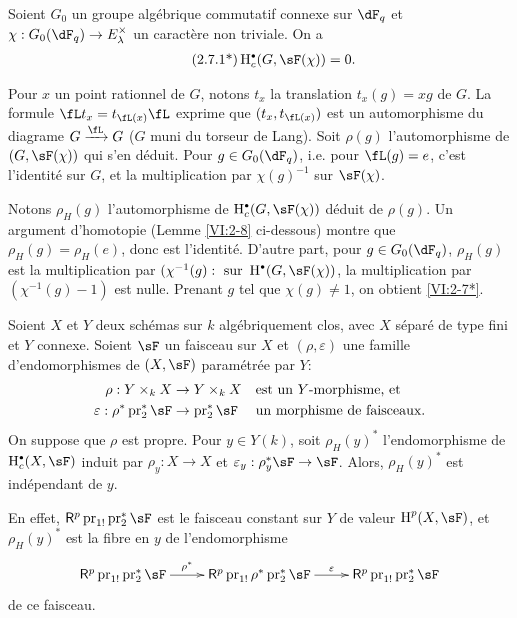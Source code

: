 \begin{theorem*}[2.7*]\label{VI:2-7*}
Soient $G_0$ un groupe alg\'ebrique commutatif connexe sur $\dF_q$ et 
$\chi:G_0(\dF_q) \to E_\lambda^\times$ un caract\`ere non triviale. On a 
\begin{align*}\tag{2.7.1*}\label{VI:eq:2-7-1*}
  \h_c^\bullet(G,\sF(\chi)) = 0 \text{.}
\end{align*}
\end{theorem*}

Pour $x$ un point rationnel de $G$, notons $t_x$ la translation $t_x(g) = x g$ 
de $G$. La formule $\fL t_x = t_{\fL(x)} \fL$ exprime que $(t_x,t_{\fL(x)})$ 
est un automorphisme du diagrame $G\xrightarrow\fL G$ ($G$ muni du torseur de 
Lang). Soit $\rho(g)$ l'automorphisme de $(G,\sF(\chi))$ qui s'en d\'eduit. 
Pour $g\in G_0(\dF_q)$, i.e. pour $\fL(g) = e$, c'est l'identit\'e sur $G$, et 
la multiplication par $\chi(g)^{-1}$ sur $\sF(\chi)$. 

Notons $\rho_H(g)$ l'automorphisme de $\h_c^\bullet(G,\sF(\chi))$ d\'eduit de 
$\rho(g)$. Un argument d'homotopie (Lemme \ref{VI:2-8} ci-dessous) montre que 
$\rho_H(g) = \rho_H(e)$, donc est l'identit\'e. D'autre part, pour 
$g\in G_0(\dF_q)$, $\rho_H(g)$ est la multiplication par 
$(\chi^{-1}(g):\text{ sur }\h^\bullet(G,\sF(\chi))$, la multiplication par 
$(\chi^{-1}(g)-1)$ est nulle. Prenant $g$ tel que $\chi(g)\ne 1$, on obtient 
\ref{VI:2-7*}. 





\begin{lemma_}\label{VI:2-8}
Soient $X$ et $Y$ deux sch\'emas sur $k$ alg\'ebriquement clos, avec $X$ 
s\'epar\'e de type fini et $Y$ connexe. Soient $\sF$ un faisceau sur $X$ et 
$(\rho,\varepsilon)$ une famille d'endomorphismes de $(X,\sF)$ param\'etr\'ee 
par $Y$: 
\begin{align*} 
  \rho:Y\times_k X &\to Y\times_k X && \text{est un $Y$-morphisme, et} \\
  \varepsilon:\rho^\ast \operatorname{pr}_2^\ast \sF &\to \operatorname{pr}_2^\ast\sF && \text{un morphisme de faisceaux.} 
\end{align*}
On suppose que $\rho$ est propre. Pour $y\in Y(k)$, soit $\rho_H(y)^\ast$ 
l'endomorphisme de $\h_c^\bullet(X,\sF)$ induit par $\rho_y:X\to X$ et 
$\varepsilon_y:\rho_y^\ast\sF\to \sF$. Alors, $\rho_H(y)^\ast$ est 
ind\'ependant de $y$. 
\end{lemma_}

En effet, $\R^p \operatorname{pr}_{1!} \operatorname{pr}_2^\ast\sF$ est le 
faisceau constant sur $Y$ de valeur $\h^p(X,\sF)$, et $\rho_H(y)^\ast$ est la 
fibre en $y$ de l'endomorphisme 
\[\xymatrix{
  \R^p \operatorname{pr}_{1!} \operatorname{pr}_2^\ast \sF \ar[r]^-{\rho^\ast} 
    & \R^p \operatorname{pr}_{1!} \rho^\ast \operatorname{pr}_2^\ast \sF \ar[r]^-\varepsilon 
    & \R^p \operatorname{pr}_{1!} \operatorname{pr}_2^\ast \sF 
}\]
de ce faisceau. 





